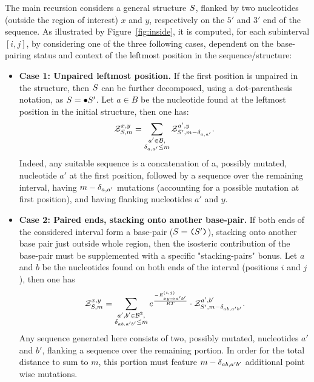 The main recursion considers a general structure $S$, flanked by two nucleotides (outside the region of interest) $x$ and $y$, respectively on the $5'$ and $3'$ end of the sequence. As illustrated by Figure~\ref{fig:inside}, it is computed, for each subinterval $[i,j]$, by considering one of the three following cases, dependent on the base-pairing status and context of the leftmost position in the sequence/structure:
\begin{itemize}
\item {\bf Case 1: Unpaired leftmost position.} If the first position  is unpaired in the structure, then $S$ can be further decomposed, using a dot-parenthesis notation, as $S = \bullet S'$. Let $a\in B$ be the nucleotide found at the leftmost position in the initial structure, then one has:
\begin{equation}
\label{eq:Z_rec_A}
	\mathcal{Z}_{S, m}^{x,y} =
      \sum_{\substack{a'\in \mathcal{B},\\ \delta_{a,a'}\le m}}  
      \mathcal{Z}_{S', m-\delta_{a,a'}}^{a',y}.
\end{equation}
Indeed, any suitable sequence is a concatenation of a, possibly mutated, nucleotide $a'$ at the first position, followed by a sequence over the remaining interval, having $m-\delta_{a,a'}$ mutations (accounting for a possible mutation at first position), and having flanking nucleotides $a'$ and $y$.
\item {\bf Case 2: Paired ends, stacking onto another base-pair.} If both ends of the considered interval form a base-pair ($S = \text{\tt(}S'\text{\tt )}$), stacking onto another base pair just outside whole region, then the isosteric contribution of the base-pair must be supplemented with a specific "stacking-pairs" bonus. Let $a$ and $b$ be the nucleotides found on both ends of the interval (positions $i$ and $j$), then one has
\begin{equation}
\label{eq:Z_rec_B}
	\mathcal{Z}_{S, m}^{x,y} =
      \sum_{\substack{a',b'\in \mathcal{B}^2,\\ \delta_{ab,a'b'}\le m}}
			 e^{\frac{-E^{(i,j)}_{{xy}\to{a'b'}}}{RT}}
			 \cdot \mathcal{Z}_{S', m-\delta_{ab,a'b'}}^{a',b'}.
\end{equation}
Any sequence generated here consists of two, possibly mutated, nucleotides $a'$ and $b'$, flanking a sequence over the remaining portion. In order for the total distance to sum to $m$, this portion must feature $m-\delta_{ab,a'b'}$ additional point wise mutations.


\end{itemize}
